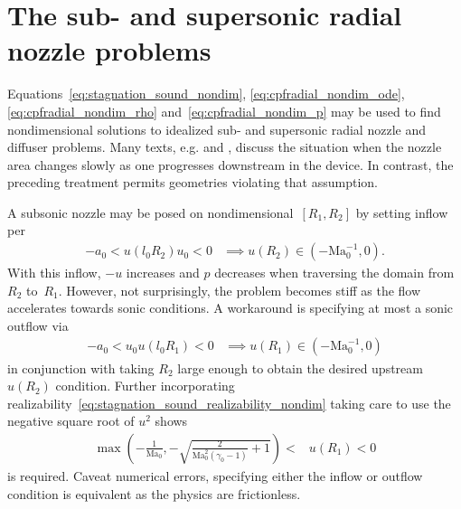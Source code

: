 \documentclass[letterpaper,11pt,nointlimits,reqno]{amsart}
\newcommand{\Mach}[1][]{\mbox{Ma}_{#1}}
\begin{document}
\section{The sub- and supersonic radial nozzle problems}

Equations~\eqref{eq:stagnation_sound_nondim}, \eqref{eq:cpfradial_nondim_ode},
\eqref{eq:cpfradial_nondim_rho} and~\eqref{eq:cpfradial_nondim_p} may be used
to find nondimensional solutions to idealized sub- and supersonic radial nozzle
and diffuser problems. Many texts, e.g.
\citet[\textsection{}9.4]{White1999Fluid} and
\citet[\textsection{}97]{Landau2004Fluid}, discuss the situation when the
nozzle area changes slowly as one progresses downstream in the device.  In
contrast, the preceding treatment permits geometries violating that assumption.

A subsonic nozzle may be posed on nondimensional~$\left[R_{1}, R_{2}\right]$ by
setting inflow per
\begin{align}
    -a_0 < u\!\left(l_0 R_{2}\right) u_0 < 0
    &\implies
    u\!\left(R_{2}\right) \in \left(-\Mach[0]^{-1}, 0\right)
.
\end{align}
With this inflow, $-u$ increases and $p$ decreases when traversing the
domain from~$R_{2}$ to~$R_{1}$.  However, not surprisingly, the problem becomes
stiff as the flow accelerates towards sonic conditions.  A workaround is
specifying at most a sonic outflow via
\begin{align}
    -a_0 < u_0 u\!\left(l_0 R_1\right) < 0
    &\implies
    u\!\left(R_1\right) \in \left(-\Mach[0]^{-1}, 0\right)
\end{align}
in conjunction with taking $R_{2}$ large enough to obtain the desired upstream
$u\!\left(R_{2}\right)$ condition.  Further incorporating
realizability~\eqref{eq:stagnation_sound_realizability_nondim} taking care to
use the negative square root of $u^2$ shows
\begin{align}
  \max\left(
    -\frac{1}{\Mach[0]}, -\sqrt{\frac{2}{\Mach[0]^2\left(\gamma_0-1\right)}+1}
  \right) < &u\!\left(R_1\right) < 0
\label{eq:cpfradial_nozzle_subsonic_bc}
\end{align}
is required.  Caveat numerical errors, specifying either the inflow or outflow
condition is equivalent as the physics are frictionless.
\end{document}
